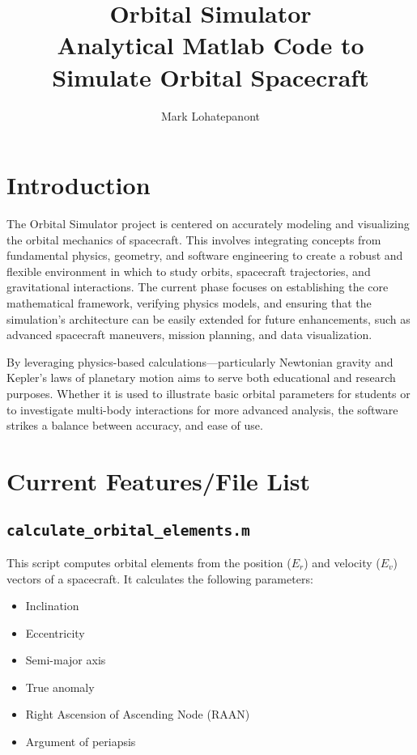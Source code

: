 \documentclass{article}
\title{Orbital Simulator \\
	\large{Analytical Matlab Code to Simulate Orbital Spacecraft }}
\author{Mark Lohatepanont}
\begin{document}
	\maketitle
	\tableofcontents
	\newpage
	\section{Introduction}
	The Orbital Simulator project is centered on accurately modeling and visualizing the orbital mechanics of spacecraft. This involves integrating concepts from fundamental physics, geometry, and software engineering to create a robust and flexible environment in which to study orbits, spacecraft trajectories, and gravitational interactions. The current phase focuses on establishing the core mathematical framework, verifying physics models, and ensuring that the simulation’s architecture can be easily extended for future enhancements, such as advanced spacecraft maneuvers, mission planning, and data visualization.
	
	By leveraging physics-based calculations—particularly Newtonian gravity and Kepler’s laws of planetary motion aims to serve both educational and research purposes. Whether it is used to illustrate basic orbital parameters for students or to investigate multi-body interactions for more advanced analysis, the software strikes a balance between accuracy, and ease of use.
	
	\section{Current Features/File List}
	

	\subsection{\texttt{calculate\_orbital\_elements.m}}
	This script computes orbital elements from the position (\texttt{$E_r$}) and velocity (\texttt{$E_v$}) vectors of a spacecraft. It calculates the following parameters:
	\begin{itemize}
		\item Inclination
		\item Eccentricity
		\item Semi-major axis
		\item True anomaly
		\item Right Ascension of Ascending Node (RAAN)
		\item Argument of periapsis
	\end{itemize}
	
\end{document}
